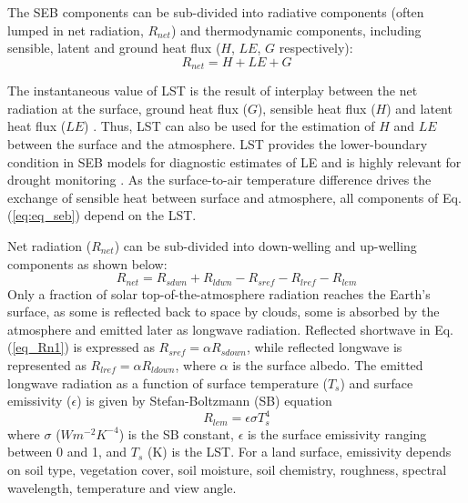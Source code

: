 \documentclass[fleqn,10pt]{wlscirep}
\begin{document}
The SEB components can be sub-divided into radiative components (often lumped in net radiation, $R_{net}$) and thermodynamic components, including sensible, latent and ground heat flux ($H$, $LE$, $G$ respectively):
\begin{equation}\label{eq:eq_seb}
R_{net} = H + LE + G 
\end{equation}
  
The instantaneous value of LST is the result of interplay between the net radiation at the surface, ground heat flux ($G$), sensible heat flux ($H$) and latent heat flux ($LE$) \cite{wang2013global}. Thus, LST can also be used for the estimation of $H$ \cite{sun1995relationship} and $LE$ \cite{jacob2001comprehensive} between the surface and the atmosphere. LST provides the lower-boundary condition in SEB models for diagnostic estimates of LE  and is highly relevant for drought monitoring \cite{trebs2021role,mallick2016canopy,mallick2015reintroducing}. As the surface-to-air temperature difference drives the exchange of sensible heat between surface and atmosphere, all components of Eq. (\ref{eq:eq_seb}) depend on the LST.
 
 
 Net radiation ($R_{net}$) can be sub-divided into down-welling and up-welling components \cite{verma2016global} as shown below:
\begin{equation}\label{eq_Rn1}
R_{net} = R_{sdwn} + R_{ldwn} - R_{sref} - R_{lref} - R_{lem}
\end{equation}
 Only a fraction of solar top-of-the-atmosphere radiation reaches the Earth's surface, as some is reflected back to space by clouds, some is absorbed by the atmosphere and emitted later as longwave radiation. Reflected shortwave in Eq. ({\ref{eq_Rn1}}) is expressed as $R_{sref} = \alpha R_{sdown}$, while reflected longwave is represented as $R_{lref} = \alpha R_{ldown}$, where $\alpha$ is the surface albedo. The emitted longwave radiation as a function of surface temperature ($T_s$) and surface emissivity ($\epsilon$) is given by Stefan-Boltzmann (SB) equation \cite{lhomme1988radiative}
\begin{equation}\label{eq_Rlem}
R_{lem}= \epsilon \sigma T_{s}^{4}
\end{equation}
where $\sigma$ ($Wm^{-2}K^{-4}$) is the SB constant, $\epsilon$ is the surface emissivity ranging between 0 and 1, and $T_{s}$ (K) is the LST. For a land surface, emissivity depends on soil type, vegetation cover, soil moisture, soil chemistry, roughness, spectral wavelength, temperature and view angle\cite{norman1995terminology}. 
\end{document}
